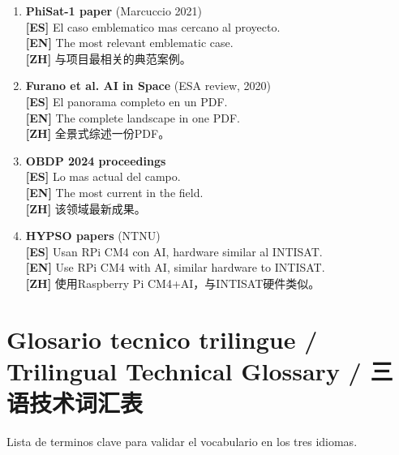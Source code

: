 \documentclass[11pt,a4paper]{report}
\begin{document}
\begin{enumerate}[leftmargin=2em]
  \item \textbf{PhiSat-1 paper} (Marcuccio 2021)\\
        \textbf{[ES]} El caso emblematico mas cercano al proyecto.\\
        \textbf{[EN]} The most relevant emblematic case.\\
        \textbf{[ZH]} 与项目最相关的典范案例。

  \item \textbf{Furano et al. AI in Space} (ESA review, 2020)\\
        \textbf{[ES]} El panorama completo en un PDF.\\
        \textbf{[EN]} The complete landscape in one PDF.\\
        \textbf{[ZH]} 全景式综述一份PDF。

  \item \textbf{OBDP 2024 proceedings}\\
        \textbf{[ES]} Lo mas actual del campo.\\
        \textbf{[EN]} The most current in the field.\\
        \textbf{[ZH]} 该领域最新成果。

  \item \textbf{HYPSO papers} (NTNU)\\
        \textbf{[ES]} Usan RPi CM4 con AI, hardware similar al INTISAT.\\
        \textbf{[EN]} Use RPi CM4 with AI, similar hardware to INTISAT.\\
        \textbf{[ZH]} 使用Raspberry Pi CM4+AI，与INTISAT硬件类似。
\end{enumerate}

\chapter{Glosario tecnico trilingue / Trilingual Technical Glossary / 三语技术词汇表}

Lista de terminos clave para validar el vocabulario en los tres idiomas.
\end{document}
